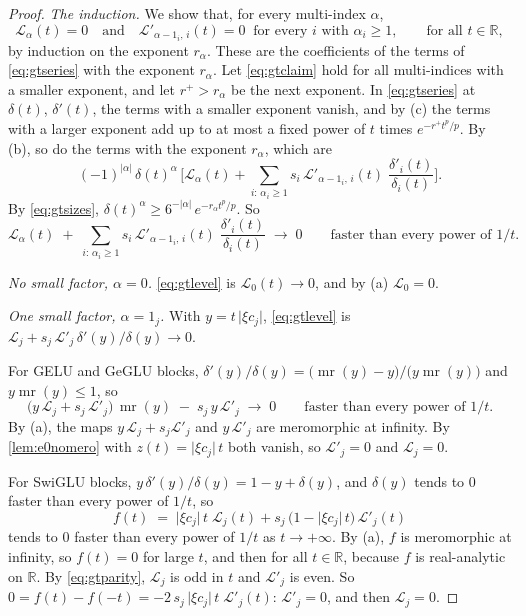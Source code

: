 \documentclass[10pt]{article}
\theoremstyle{definition}
\theoremstyle{remark}
\newcommand{\R}{\mathbb{R}}
\begin{document}
\begin{proof}
\emph{The induction.} We show that, for every multi-index $\alpha$,
\begin{equation}\label{eq:gtclaim}
\mathcal L_\alpha(t) = 0 \quad\text{and}\quad \mathcal L'_{\alpha - 1_i,\,i}(t) = 0 \ \text{ for every } i \text{ with } \alpha_i \ge 1, \qquad\text{for all } t \in \R,
\end{equation}
by induction on the exponent $r_\alpha$. These are the coefficients of the terms of \eqref{eq:gtseries} with the exponent $r_\alpha$. Let \eqref{eq:gtclaim} hold for all multi-indices with a smaller exponent, and let $r^+ > r_\alpha$ be the next exponent. In \eqref{eq:gtseries} at $\delta(t)$, $\delta'(t)$, the terms with a smaller exponent vanish, and by (c) the terms with a larger exponent add up to at most a fixed power of $t$ times $e^{-r^+t^p/p}$. By (b), so do the terms with the exponent $r_\alpha$, which are
\[
(-1)^{\lvert\alpha\rvert}\,\delta(t)^\alpha\,\Big[\mathcal L_\alpha(t) + \sum_{i:\,\alpha_i\ge1}s_i\,\mathcal L'_{\alpha - 1_i,\,i}(t)\;\frac{\delta'_i(t)}{\delta_i(t)}\Big] .
\]
By \eqref{eq:gtsizes}, $\delta(t)^\alpha \ge 6^{-\lvert\alpha\rvert}\,e^{-r_\alpha t^p/p}$. So
\begin{equation}\label{eq:gtlevel}
\mathcal L_\alpha(t) \;+\; \sum_{i:\,\alpha_i\ge1}s_i\,\mathcal L'_{\alpha - 1_i,\,i}(t)\;\frac{\delta'_i(t)}{\delta_i(t)} \;\longrightarrow\; 0 \qquad\text{faster than every power of } 1/t .
\end{equation}

\emph{No small factor, $\alpha = 0$.} \eqref{eq:gtlevel} is $\mathcal L_0(t) \to 0$, and by (a) $\mathcal L_0 = 0$.

\emph{One small factor, $\alpha = 1_j$.} With $y = t\,\lvert\xi c_j\rvert$, \eqref{eq:gtlevel} is $\mathcal L_j + s_j\,\mathcal L'_j\,\delta'(y)/\delta(y) \to 0$.

For GELU and GeGLU blocks, $\delta'(y)/\delta(y) = \big(\operatorname{mr}(y) - y\big)/\big(y\operatorname{mr}(y)\big)$ and $y\operatorname{mr}(y) \le 1$, so
\[
\big(y\,\mathcal L_j + s_j\,\mathcal L'_j\big)\,\operatorname{mr}(y) \;-\; s_j\,y\,\mathcal L'_j \;\longrightarrow\; 0 \qquad\text{faster than every power of } 1/t .
\]
By (a), the maps $y\,\mathcal L_j + s_j\mathcal L'_j$ and $y\,\mathcal L'_j$ are meromorphic at infinity. By \cref{lem:e0nomero} with $z(t) = \lvert\xi c_j\rvert\,t$ both vanish, so $\mathcal L'_j = 0$ and $\mathcal L_j = 0$.

For SwiGLU blocks, $y\,\delta'(y)/\delta(y) = 1 - y + \delta(y)$, and $\delta(y)$ tends to $0$ faster than every power of $1/t$, so
\[
f(t) \;=\; \lvert\xi c_j\rvert\,t\;\mathcal L_j(t) + s_j\,\big(1 - \lvert\xi c_j\rvert\,t\big)\,\mathcal L'_j(t)
\]
tends to $0$ faster than every power of $1/t$ as $t \to +\infty$. By (a), $f$ is meromorphic at infinity, so $f(t) = 0$ for large $t$, and then for all $t \in \R$, because $f$ is real-analytic on $\R$. By \eqref{eq:gtparity}, $\mathcal L_j$ is odd in $t$ and $\mathcal L'_j$ is even. So $0 = f(t) - f(-t) = -2\,s_j\,\lvert\xi c_j\rvert\,t\;\mathcal L'_j(t)$: $\mathcal L'_j = 0$, and then $\mathcal L_j = 0$.


\end{proof}
\end{document}
